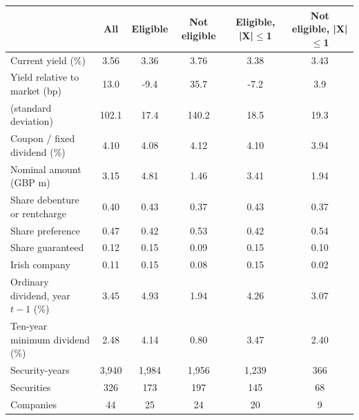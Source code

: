 \begin{tabular}{lccccc}
\toprule
 & All & Eligible & Not eligible & Eligible, |X|$\le$1 & Not eligible, |X|$\le$1 \\
\midrule
Current yield (\%) & 3.56 & 3.36 & 3.76 & 3.38 & 3.43 \\
Yield relative to market (bp) & 13.0 & -9.4 & 35.7 & -7.2 & 3.9 \\
\quad (standard deviation) & 102.1 & 17.4 & 140.2 & 18.5 & 19.3 \\
Coupon / fixed dividend (\%) & 4.10 & 4.08 & 4.12 & 4.10 & 3.94 \\
Nominal amount (GBP m) & 3.15 & 4.81 & 1.46 & 3.41 & 1.94 \\
Share debenture or rentcharge & 0.40 & 0.43 & 0.37 & 0.43 & 0.37 \\
Share preference & 0.47 & 0.42 & 0.53 & 0.42 & 0.54 \\
Share guaranteed & 0.12 & 0.15 & 0.09 & 0.15 & 0.10 \\
Irish company & 0.11 & 0.15 & 0.08 & 0.15 & 0.02 \\
Ordinary dividend, year $t-1$ (\%) & 3.45 & 4.93 & 1.94 & 4.26 & 3.07 \\
Ten-year minimum dividend (\%) & 2.48 & 4.14 & 0.80 & 3.47 & 2.40 \\
Security-years & 3,940 & 1,984 & 1,956 & 1,239 & 366 \\
Securities & 326 & 173 & 197 & 145 & 68 \\
Companies & 44 & 25 & 24 & 20 & 9 \\
\bottomrule
\end{tabular}
